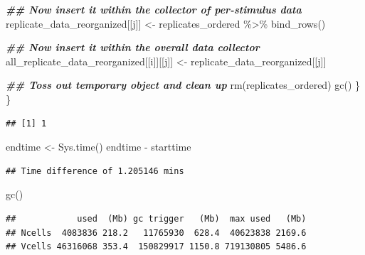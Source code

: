 \documentclass[
]{book}
\newenvironment{Shaded}{\begin{snugshade}}{\end{snugshade}}
\newcommand{\CommentTok}[1]{\textcolor[rgb]{0.56,0.35,0.01}{\textit{#1}}}
\newcommand{\ControlFlowTok}[1]{\textcolor[rgb]{0.13,0.29,0.53}{\textbf{#1}}}
\newcommand{\DecValTok}[1]{\textcolor[rgb]{0.00,0.00,0.81}{#1}}
\newcommand{\DocumentationTok}[1]{\textcolor[rgb]{0.56,0.35,0.01}{\textbf{\textit{#1}}}}
\newcommand{\FunctionTok}[1]{\textcolor[rgb]{0.00,0.00,0.00}{#1}}
\newcommand{\NormalTok}[1]{#1}
\newcommand{\OtherTok}[1]{\textcolor[rgb]{0.56,0.35,0.01}{#1}}
\newcommand{\SpecialCharTok}[1]{\textcolor[rgb]{0.00,0.00,0.00}{#1}}
\begin{document}
\begin{Shaded}
\begin{Highlighting}[]
    \DocumentationTok{\#\# Now insert it within the collector of per{-}stimulus data}
\NormalTok{    replicate\_data\_reorganized[[j]] }\OtherTok{\textless{}{-}}
\NormalTok{      replicates\_ordered }\SpecialCharTok{\%\textgreater{}\%}
      \FunctionTok{bind\_rows}\NormalTok{()}

    \DocumentationTok{\#\# Now insert it within the overall data collector}
\NormalTok{    all\_replicate\_data\_reorganized[[i]][[j]] }\OtherTok{\textless{}{-}}
\NormalTok{      replicate\_data\_reorganized[[j]]}

    \DocumentationTok{\#\# Toss out temporary object and clean up}
    \FunctionTok{rm}\NormalTok{(replicates\_ordered)}
    \FunctionTok{gc}\NormalTok{()}
\NormalTok{  \}}
\NormalTok{\}}
\end{Highlighting}
\end{Shaded}

\begin{verbatim}
## [1] 1
\end{verbatim}

\begin{Shaded}
\begin{Highlighting}[]
\NormalTok{endtime }\OtherTok{\textless{}{-}} \FunctionTok{Sys.time}\NormalTok{()}
\NormalTok{endtime }\SpecialCharTok{{-}}\NormalTok{ starttime}
\end{Highlighting}
\end{Shaded}

\begin{verbatim}
## Time difference of 1.205146 mins
\end{verbatim}

\begin{Shaded}
\begin{Highlighting}[]
\FunctionTok{gc}\NormalTok{()}
\end{Highlighting}
\end{Shaded}

\begin{verbatim}
##            used  (Mb) gc trigger   (Mb)  max used   (Mb)
## Ncells  4083836 218.2   11765930  628.4  40623838 2169.6
## Vcells 46316068 353.4  150829917 1150.8 719130805 5486.6
\end{verbatim}

\begin{Shaded}
\end{Shaded}
\end{document}
